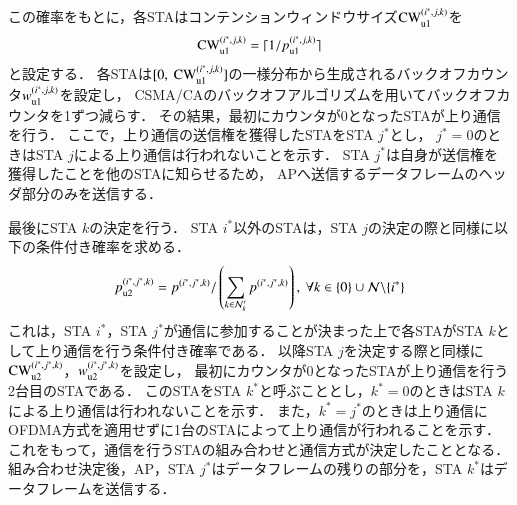 \documentclass[master]{kuisthesis}		%
\newcommand{\mthnk}{{\mathcal N}'_k}
\begin{document}
			この確率をもとに，各STAはコンテンションウィンドウサイズ${\rm CW}^{(i^*,j,k)}_{\rm u1}$を
			\begin{equation}
				{\rm CW}^{(i^*,j,k)}_{\rm u1} = \lceil 1/p_{\rm u1}^{(i^*,j,k)} \rceil
			\end{equation}
			と設定する．
			各STAは$[0,\ {\rm CW}^{(i^*,j,k)}_{\rm u1}]$の一様分布から生成されるバックオフカウンタ$w_{\rm u1}^{(i^*,j,k)}$を設定し，
			CSMA/CAのバックオフアルゴリズムを用いてバックオフカウンタを1ずつ減らす．
			その結果，最初にカウンタが0となったSTAが上り通信を行う．
			ここで，上り通信の送信権を獲得したSTAをSTA $j^*$とし，
			$j^*=0$のときはSTA $j$による上り通信は行われないことを示す．
			STA $j^*$は自身が送信権を獲得したことを他のSTAに知らせるため，
			APへ送信するデータフレームのヘッダ部分のみを送信する．
			\par
			最後にSTA $k$の決定を行う．
			STA $i^*$以外のSTAは，STA $j$の決定の際と同様に以下の条件付き確率を求める．
			\begin{align}
				p_{\rm u2}^{(i^*,j^*,k)}=p^{(i^*,j^*,k)} / \left(\sum_{k\in\mthnk} p^{(i^*,j^*,k)}\right),\ \forall k \in \{0\}\cup{\mathcal N}\backslash \{i^*\}
			\end{align}
			これは，STA $i^*$，STA $j^*$が通信に参加することが決まった上で各STAがSTA $k$として上り通信を行う条件付き確率である．
			以降STA $j$を決定する際と同様に${\rm CW}^{(i^*,j^*,k)}_{\rm u2}$，$w_{\rm u2}^{(i^*,j^*,k)}$を設定し，
			最初にカウンタが0となったSTAが上り通信を行う2台目のSTAである．
			このSTAをSTA $k^*$と呼ぶこととし，$k^*=0$のときはSTA $k$による上り通信は行われないことを示す．
			また，$k^*=j^*$のときは上り通信にOFDMA方式を適用せずに1台のSTAによって上り通信が行われることを示す．
			これをもって，通信を行うSTAの組み合わせと通信方式が決定したこととなる．
			組み合わせ決定後，AP，STA $j^*$はデータフレームの残りの部分を，STA $k^*$はデータフレームを送信する．
\end{document}
